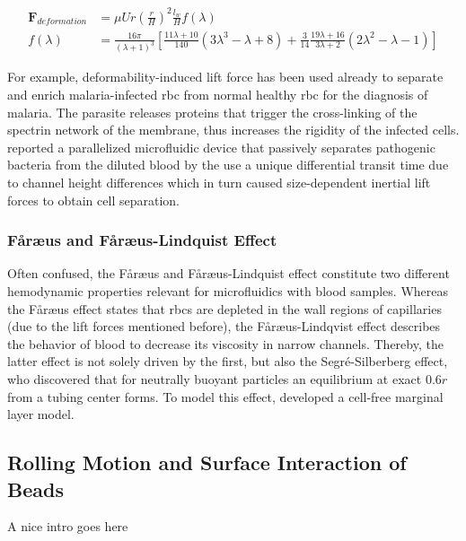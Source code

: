 \begin{align}
	\mathbf{F}_{deformation}&=\mu U r \left(\frac{r}{H}\right)^{2} \frac{l_w}{H} f\left(\lambda\right) \label{eq:f:deform}\\
	f(\lambda) &=\frac{16 \pi}{\left(\lambda+1\right)^{3}}\left[\frac{11 \lambda+10}{140}\left(3 \lambda^{3}-\lambda+8\right)+\frac{3}{14} \frac{19 \lambda+16}{3 \lambda+2}\left(2 \lambda^{2}-\lambda-1\right)\right] 
\end{align}

For example, deformability-induced  lift  force  has  been  used  already to  separate  and  enrich  malaria-infected \gls{rbc}  from  normal  healthy  \gls{rbc} for  the  diagnosis  of  malaria.  The parasite releases proteins that trigger the cross-linking of the spectrin network of the membrane, thus increases the rigidity of the infected cells.\cite{lit:fluid:deformability}
\citet{lit:fluid:deformabilityDiCarlo} reported a parallelized  microfluidic  device  that  passively separates pathogenic bacteria from the diluted blood by the use a unique differential transit time due to channel height differences which in turn caused size-dependent inertial  lift forces to obtain cell separation.

\subsubsection{F\aa{}r\ae{}us and F\aa{}r\ae{}us-Lindquist Effect}
Often confused, the F\aa{}r\ae{}us and F\aa{}r\ae{}us-Lindquist effect constitute two different hemodynamic properties relevant for microfluidics with blood samples. Whereas the  F\aa{}r\ae{}us effect states that \glspl{rbc} are depleted in the wall regions of capillaries (due to the lift forces mentioned before), the F\aa{}r\ae{}us-Lindqvist effect describes the behavior of blood to decrease its viscosity in narrow channels.\cite{lit:fluid:faraeus, lit:fluid:faraeuslinquvist} Thereby, the latter effect is not solely driven by the first, but also the Segr\'{e}-Silberberg effect, who discovered that for neutrally buoyant particles an equilibrium at exact $0.6r$ from a tubing center forms.\cite{lit:fluid:silberbereffect} To model this effect, \citet{lit:fluid:cell-free-model} developed a cell-free marginal layer model.


\subsection{Rolling Motion and Surface Interaction of Beads}
A nice intro goes here
